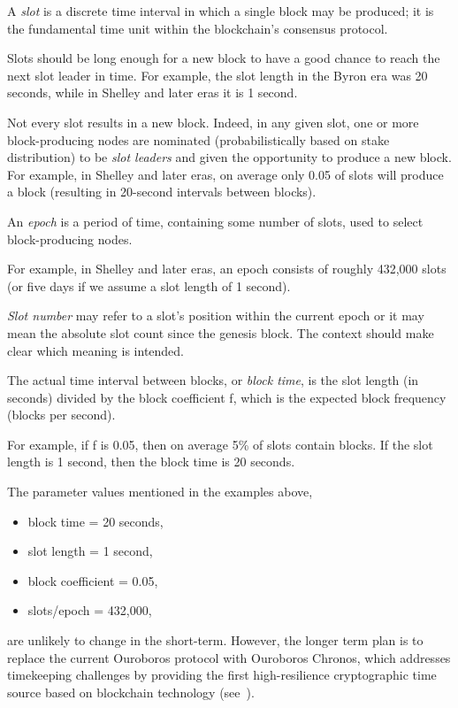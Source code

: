 \begin{definition}[slot]
  A \emph{slot} is a discrete time interval in which a single block may be produced; it
  is the fundamental time unit within the blockchain's consensus protocol.
\end{definition}
Slots should be long enough for a new block to have a good chance to reach
the next slot leader in time.  For example, the slot length in the Byron era was 20
seconds, while in Shelley and later eras it is 1 second.

Not every slot results in a new block.  Indeed, in any given slot, one or more
block-producing nodes are nominated (probabilistically based on stake distribution)
to be \textit{slot leaders} and given the opportunity to produce a new block.
For example, in Shelley and later eras, on average only 0.05 of slots will produce a
block (resulting in 20-second intervals between blocks).

\begin{definition}[epoch]
  An \emph{epoch} is a period of time, containing some number of slots, used to select
  block-producing nodes.
\end{definition}
For example, in Shelley and later eras, an epoch consists of roughly 432,000 slots (or five
days if we assume a slot length of 1 second).

\begin{definition}
  \emph{Slot number} may refer to a slot's position within the current epoch or it
  may mean the absolute slot count since the genesis block.  The context should make
  clear which meaning is intended.
\end{definition}

\begin{definition}
  The actual time interval between blocks, or \emph{block time}, is the slot length
  (in seconds) divided by the block coefficient f, which is the expected block
  frequency (blocks per second).
\end{definition}
For example, if f is 0.05, then on average 5\% of slots contain blocks.
If the slot length is 1 second, then the block time is 20 seconds.

The parameter values mentioned in the examples above,
\begin{itemize}[noitemsep]
  \item block time = 20 seconds,
  \item slot length = 1 second,
  \item block coefficient = 0.05,
  \item slots/epoch = 432,000,
\end{itemize}
are unlikely to change in the short-term.  However, the longer term plan is to replace the current Ouroboros  protocol with Ouroboros Chronos, which addresses timekeeping challenges by providing the first
high-resilience cryptographic time source based on blockchain technology (see~\textcite{www-iohk-blog-ouroboros}).
